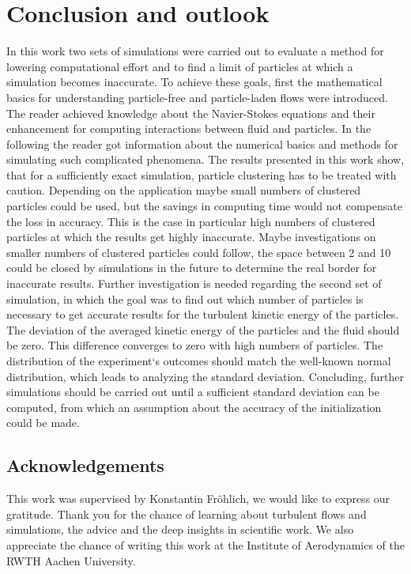 \documentclass[11pt,a4paper,openany,oneside,parskip=half*]{article}
\begin{document}
\section{Conclusion and outlook}
In this work two sets of simulations were carried out to evaluate a method for lowering computational effort and to find a limit of particles at which a simulation becomes inaccurate. 
\newline
To achieve these goals, first the mathematical basics for understanding particle-free and particle-laden flows were introduced. The reader achieved knowledge about the Navier-Stokes equations and their enhancement for computing interactions between fluid and particles. In the following the reader got information about the numerical basics and methods for simulating such complicated phenomena. 
\newline
The results presented in this work show, that for a sufficiently exact simulation, particle clustering has to be treated with caution. Depending on the application maybe small numbers of clustered particles could be used, but the savings in computing time would not compensate the loss in accuracy. This is the case in particular high numbers of clustered particles at which the results get highly inaccurate. Maybe investigations on smaller numbers of clustered particles could follow, the space between 2 and 10 could be closed by simulations in the future to determine the real border for inaccurate results. 
\newline
Further investigation is needed regarding the second set of simulation, in which the goal was to find out which number of particles is necessary to get accurate results for the turbulent kinetic energy of the particles. The deviation of the averaged kinetic energy of the particles and the fluid should be zero. This difference converges to zero with high numbers of particles. The distribution of the experiment`s outcomes should match the well-known normal distribution, which leads to analyzing the standard deviation. Concluding, further simulations should be carried out until a sufficient standard deviation can be computed, from which an assumption about the accuracy of the initialization could be made.
\subsection*{Acknowledgements}
This work was supervised by Konstantin Fr\"ohlich, we would like to express our gratitude. Thank you for the chance of learning about turbulent flows and simulations, the advice and the deep insights in scientific work. We also appreciate the chance of writing this work at the Institute of Aerodynamics of the RWTH Aachen University.
\pagebreak
\end{document}
